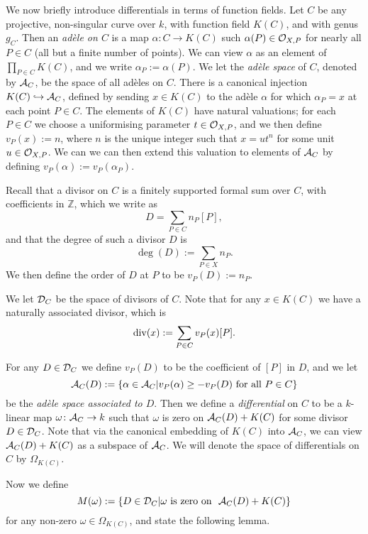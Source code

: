 We now briefly introduce differentials in terms of function fields.
Let $C$ be any projective, non-singular curve over $k$, with function field $K(C)$, and with genus $g_C$.
Then an {\em ad\`ele on $C$} is a map $\alpha\colon  C \rightarrow K(C)$ such $\alpha(P) \in {\cal O}_{X,P}$ for nearly all $P \in C$ (\ie all but a finite number of points).
We can view $\alpha$ as an element of $\prod_{P\in C}K(C)$, and we write $\alpha_P := \alpha(P)$.
We let the {\em ad\`ele space} of $C$, denoted by ${\mathcal A}_C$, be the space of all ad\`eles on $C$.
There is a canonical injection $K(C) \hookrightarrow  {\mathcal A}_C$, defined by sending $x\in K(C)$ to the ad\`ele $\alpha$ for which $\alpha_P =  x$ at each point $P\in C$.
The elements of $K(C)$ have natural valuations; for each $P\in C$ we choose a uniformising parameter $t\in {\cal O}_{X,P}$, and we then define $v_P(x):=n$, where $n$ is the unique integer such that $x=ut^n$ for some unit $u\in {\cal O}_{X,P}$.
We can we can then extend this valuation to elements of ${\mathcal A}_C$ by defining $v_P(\alpha) := v_P(\alpha_P)$.

Recall that a divisor on $C$ is a finitely supported formal sum over $C$, with coefficients in $\mathbb Z$, which we write as 
\[
 D = \sum_{P\in C} n_P [P],
\]
and that the degree of such a divisor $D$ is 
\[
 \deg(D) := \sum_{P\in X} n_P.
\]
We then define the order of $D$ at $P$ to be $v_P(D) := n_P$.

We let ${\mathcal D}_C$ be the space of divisors of $C$.
Note that for any $x\in K(C)$ we have a naturally associated divisor, which is
\[
 \operatorname{div}(x) := \sum_{P\in C} v_P(x) [P].
\]

For any $D\in {\mathcal D}_C$ we define $v_P(D)$ to be the coefficient of $[P]$ in $D$, and we let
\[
 {\mathcal A}_C(D):=\{\alpha \in {\mathcal A}_C | v_P(\alpha) \geq -v_P(D)\ \text{for all} \ P\in C\}
\]
be the {\em ad\`ele space associated to $D$}.
Then we define a {\em differential} on $C$ to be a $k$-linear map $\omega\colon  {\mathcal A}_C \rightarrow k$ such that $\omega$ is zero on ${\mathcal A}_C(D) +K(C)$ for some divisor $D\in {\mathcal D}_C$.
Note that via the canonical embedding of $K(C)$ into ${\mathcal A}_C$, we can view ${\mathcal A}_C(D) +K(C)$ as a subspace of ${\mathcal A}_C$.
We will denote the space of differentials on $C$ by $\Omega_{K(C)}$.

Now we define 
\[
 M(\omega) := \{ D\in {\mathcal D}_C | \omega \ \text{is zero on }\ {\mathcal A}_C(D) + K(C)\}
\]
for any non-zero $\omega \in \Omega_{K(C)}$, and state the following lemma.

